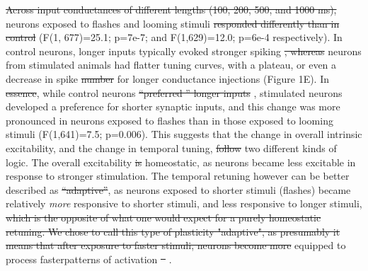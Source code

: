 \documentclass{article}
\providecommand{\DIFaddtex}[1]{{\protect\color{blue}{#1}}} %
\providecommand{\DIFdeltex}[1]{{\protect\color{red}\sout{#1}}}                      %
\providecommand{\DIFaddbegin}{} %
\providecommand{\DIFaddend}{} %
\providecommand{\DIFdelbegin}{} %
\providecommand{\DIFdelend}{} %
\providecommand{\DIFadd}[1]{\texorpdfstring{\DIFaddtex{#1}}{#1}} %
\providecommand{\DIFdel}[1]{\texorpdfstring{\DIFdeltex{#1}}{}} %
\newcommand{\DIFscaledelfig}{0.5}
\newlength{\DIFdelgraphicswidth} %
\newlength{\DIFdelgraphicsheight} %
\newcommand{\DIFaddincludegraphics}[2][]{{\color{blue}\fbox{\DIFOincludegraphics[#1]{#2}}}} %
\newcommand{\DIFdelincludegraphics}[2][]{%
\sbox{\DIFdelgraphicsbox}{\DIFOincludegraphics[#1]{#2}}%
\settoboxwidth{\DIFdelgraphicswidth}{\DIFdelgraphicsbox} %
\settoboxtotalheight{\DIFdelgraphicsheight}{\DIFdelgraphicsbox} %
\scalebox{\DIFscaledelfig}{%
\parbox[b]{\DIFdelgraphicswidth}{\usebox{\DIFdelgraphicsbox}\\[-\baselineskip] \rule{\DIFdelgraphicswidth}{0em}}\llap{\resizebox{\DIFdelgraphicswidth}{\DIFdelgraphicsheight}{%
\setlength{\unitlength}{\DIFdelgraphicswidth}%
\begin{picture}(1,1)%
\thicklines\linethickness{2pt} %
{\color[rgb]{1,0,0}\put(0,0){\framebox(1,1){}}}%
{\color[rgb]{1,0,0}\put(0,0){\line( 1,1){1}}}%
{\color[rgb]{1,0,0}\put(0,1){\line(1,-1){1}}}%
\end{picture}%
}\hspace*{3pt}}} %
} %
\DeclareRobustCommand{\DIFaddbegin}{\DIFOaddbegin \let\includegraphics\DIFaddincludegraphics} %
\DeclareRobustCommand{\DIFaddend}{\DIFOaddend \let\includegraphics\DIFOincludegraphics} %
\DeclareRobustCommand{\DIFdelbegin}{\DIFOdelbegin \let\includegraphics\DIFdelincludegraphics} %
\DeclareRobustCommand{\DIFdelend}{\DIFOaddend \let\includegraphics\DIFOincludegraphics} %
\begin{document}
\DIFdelbegin \DIFdel{Across input conductances of different lengths (100, 200, 500, and 1000 ms), }\DIFdelend \DIFaddbegin \DIFadd{We found that compared to control, }\DIFaddend neurons exposed to flashes and looming stimuli \DIFdelbegin \DIFdel{responded differently than in control }\DIFdelend \DIFaddbegin \DIFadd{had different response curves when tested across input conductances of different lengths }\DIFaddend (F(1, 677)=25.1; p=7e-7; and F(1,629)=12.0; p=6e-4 respectively). In control neurons, longer inputs \DIFaddbegin \DIFadd{(500 and 1000 ms) }\DIFaddend typically evoked stronger spiking \DIFdelbegin \DIFdel{, whereas }\DIFdelend \DIFaddbegin \DIFadd{than shorter inputs (100 and 200 ms), but }\DIFaddend neurons from stimulated animals had flatter tuning curves, with a plateau, or even a decrease in spike \DIFdelbegin \DIFdel{number }\DIFdelend \DIFaddbegin \DIFadd{output }\DIFaddend for longer conductance injections (Figure 1E). In \DIFdelbegin \DIFdel{essence}\DIFdelend \DIFaddbegin \DIFadd{other words}\DIFaddend , while control neurons \DIFdelbegin \DIFdel{“preferred ” longer inputs }\DIFdelend \DIFaddbegin \DIFadd{preferred longer inputs (responded to them with more spikes)}\DIFaddend , stimulated neurons developed a preference for shorter synaptic inputs, and this change was more pronounced in neurons exposed to flashes than in those exposed to looming stimuli (F(1,641)=7.5; p=0.006). This suggests that the change in overall intrinsic excitability, and the change in temporal tuning, \DIFdelbegin \DIFdel{follow }\DIFdelend \DIFaddbegin \DIFadd{followed }\DIFaddend two different kinds of logic. The overall excitability \DIFdelbegin \DIFdel{is }\DIFdelend \DIFaddbegin \DIFadd{was }\DIFaddend homeostatic, as neurons became less excitable in response to stronger stimulation. The temporal retuning however can be better described as \DIFdelbegin \DIFdel{“adaptive”}\DIFdelend \DIFaddbegin \DIFadd{"adaptive"}\DIFaddend , as neurons exposed to shorter stimuli (flashes) became relatively \textit{more} responsive to shorter stimuli, and less responsive to longer stimuli, \DIFdelbegin \DIFdel{which is the opposite of what one would expect for a purely homeostatic retuning. We chose to call this type of plasticity "adaptive", as presumably it means that after exposure to faster stimuli, neurons become more }\DIFdelend \DIFaddbegin \DIFadd{making them }\DIFaddend equipped to process faster\DIFaddbegin \DIFadd{, synchronous }\DIFaddend patterns of activation \DIFdelbegin \DIFdel{\mbox{%
\citep{stemmler1999information}}\hspace{0pt}%
}\DIFdelend \DIFaddbegin \DIFadd{\mbox{%
\citep{stemmler1999information, fontaine2014threshold}}\hspace{0pt}%
}\DIFaddend .
\end{document}
